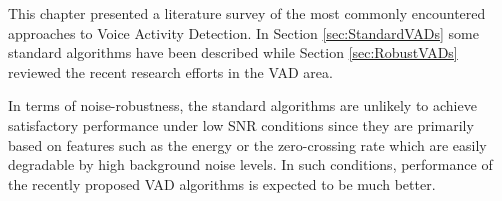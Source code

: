 This chapter presented a literature survey of the most commonly encountered approaches to Voice Activity Detection. In Section \ref{sec:StandardVADs} some standard algorithms have been described while Section \ref{sec:RobustVADs} reviewed the recent research efforts in the VAD area.

In terms of noise-robustness, the standard algorithms are unlikely to achieve satisfactory performance under low SNR conditions since they are primarily based on features such as the energy or the zero-crossing rate which are easily degradable by high background noise levels. In such conditions, performance of the recently proposed VAD algorithms is expected to be much better.